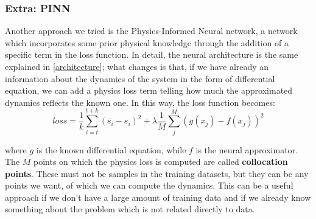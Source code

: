 \subsubsection{Extra: PINN}

Another approach we tried is the Physics-Informed Neural network, a network which incorporates
some prior physical knowledge through the addition of a specific term in the loss function.
In detail, the neural architecture is the same explained in \autoref{architecture};
what changes is that, if we have already an information about the dynamics of the system
in the form of differential equation, we can add a physics loss term telling how much the 
approximated dynamics reflects the known one. In this way, the loss function becomes:
\begin{equation}
    loss = \frac{1}{k}\sum_{i=t}^{t+k} (\bar{s}_i - s_i)^2 + \lambda \frac{1}{M}\sum_{j}^{M}(g(x_j) - f(x_j))^2
\end{equation}

where $g$ is the known differential equation, while $f$ is the neural approximator. The $M$ points
on which the physics loss is computed are called \textbf{collocation points}. These must not be
samples in the training datasets, but they can be any points we want, of which we can compute the 
dynamics. This can be a useful approach if we don't have a large amount of training data and if we
already know something about the problem which is not related directly to data. 